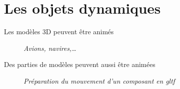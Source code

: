 \section{Les objets dynamiques}
Les modèles 3D peuvent être animés
\begin{center}
\begin{figure}[ht]
\caption{\label{anim0}\textit{Avions, navires,\ldots}}
\end{figure}
\end{center}
Des parties de modèles peuvent aussi être animées
\begin{center}
\begin{figure}[ht]
\caption{\label{anim1}\textit{Préparation du mouvement d'un composant en gltf}}
\end{figure}
\end{center}
